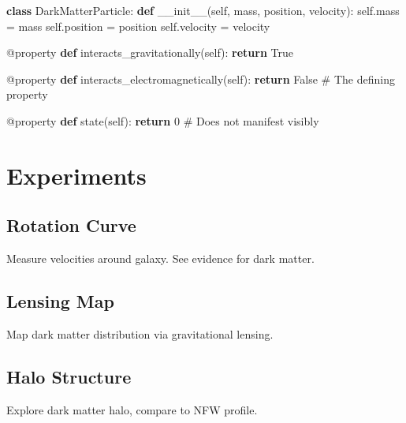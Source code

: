 \documentclass[
  11pt,
  letterpaper,
  twoside,
  openright]{book}
\newenvironment{Shaded}{\begin{snugshade}}{\end{snugshade}}
\newcommand{\AttributeTok}[1]{\textcolor[rgb]{0.40,0.45,0.13}{#1}}
\newcommand{\CommentTok}[1]{\textcolor[rgb]{0.37,0.37,0.37}{#1}}
\newcommand{\ControlFlowTok}[1]{\textcolor[rgb]{0.00,0.23,0.31}{\textbf{#1}}}
\newcommand{\DecValTok}[1]{\textcolor[rgb]{0.68,0.00,0.00}{#1}}
\newcommand{\FunctionTok}[1]{\textcolor[rgb]{0.28,0.35,0.67}{#1}}
\newcommand{\KeywordTok}[1]{\textcolor[rgb]{0.00,0.23,0.31}{\textbf{#1}}}
\newcommand{\NormalTok}[1]{\textcolor[rgb]{0.00,0.23,0.31}{#1}}
\newcommand{\OperatorTok}[1]{\textcolor[rgb]{0.37,0.37,0.37}{#1}}
\newcommand{\VariableTok}[1]{\textcolor[rgb]{0.07,0.07,0.07}{#1}}
\begin{document}
\begin{Shaded}
\begin{Highlighting}[]
\KeywordTok{class}\NormalTok{ DarkMatterParticle:}
    \KeywordTok{def} \FunctionTok{\_\_init\_\_}\NormalTok{(}\VariableTok{self}\NormalTok{, mass, position, velocity):}
        \VariableTok{self}\NormalTok{.mass }\OperatorTok{=}\NormalTok{ mass}
        \VariableTok{self}\NormalTok{.position }\OperatorTok{=}\NormalTok{ position}
        \VariableTok{self}\NormalTok{.velocity }\OperatorTok{=}\NormalTok{ velocity}

    \AttributeTok{@property}
    \KeywordTok{def}\NormalTok{ interacts\_gravitationally(}\VariableTok{self}\NormalTok{):}
        \ControlFlowTok{return} \VariableTok{True}

    \AttributeTok{@property}
    \KeywordTok{def}\NormalTok{ interacts\_electromagnetically(}\VariableTok{self}\NormalTok{):}
        \ControlFlowTok{return} \VariableTok{False}  \CommentTok{\# The defining property}

    \AttributeTok{@property}
    \KeywordTok{def}\NormalTok{ state(}\VariableTok{self}\NormalTok{):}
        \ControlFlowTok{return} \DecValTok{0}  \CommentTok{\# Does not manifest visibly}
\end{Highlighting}
\end{Shaded}

\section{Experiments}\label{experiments-30}

\subsection{Rotation Curve}\label{rotation-curve-1}

Measure velocities around galaxy. See evidence for dark matter.

\subsection{Lensing Map}\label{lensing-map}

Map dark matter distribution via gravitational lensing.

\subsection{Halo Structure}\label{halo-structure}

Explore dark matter halo, compare to NFW profile.
\end{document}
